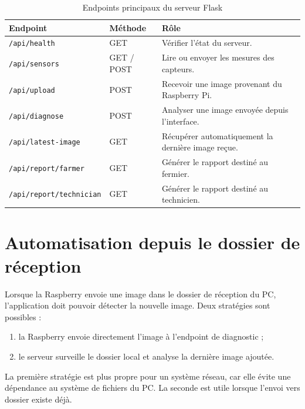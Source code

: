 ﻿\documentclass[11pt,a4paper,openany]{report}
\begin{document}
\begin{table}[H]
\centering
\small
\renewcommand{\arraystretch}{1.3}

\begin{tabular}{|p{4cm}|p{2cm}|p{7cm}|}
\hline
\textbf{Endpoint} &
\textbf{Méthode} &
\textbf{Rôle} \\
\hline

\texttt{/api/health}
& GET
& Vérifier l'état du serveur. \\
\hline

\texttt{/api/sensors}
& GET / POST
& Lire ou envoyer les mesures des capteurs. \\
\hline

\texttt{/api/upload}
& POST
& Recevoir une image provenant du Raspberry Pi. \\
\hline

\texttt{/api/diagnose}
& POST
& Analyser une image envoyée depuis l'interface. \\
\hline

\texttt{/api/latest-image}
& GET
& Récupérer automatiquement la dernière image reçue. \\
\hline

\texttt{/api/report/farmer}
& GET
& Générer le rapport destiné au fermier. \\
\hline

\texttt{/api/report/technician}
& GET
& Générer le rapport destiné au technicien. \\
\hline

\end{tabular}

\caption{Endpoints principaux du serveur Flask}
\label{tab:api}
\end{table}

\section{Automatisation depuis le dossier de réception}
Lorsque la Raspberry envoie une image dans le dossier de réception du PC, l'application doit pouvoir détecter la nouvelle image. Deux stratégies sont possibles :
\begin{enumerate}
  \item la Raspberry envoie directement l'image à l'endpoint de diagnostic ;
  \item le serveur surveille le dossier local et analyse la dernière image ajoutée.
\end{enumerate}

La première stratégie est plus propre pour un système réseau, car elle évite une dépendance au système de fichiers du PC. La seconde est utile lorsque l'envoi vers dossier existe déjà.
\end{document}
